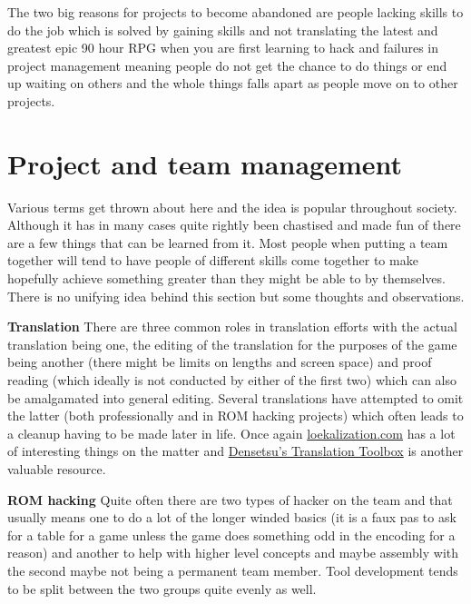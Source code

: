 \documentclass[
]{book}
\begin{document}
The two big reasons for projects to become abandoned are people lacking skills to do the job which is solved by gaining skills and not translating the latest and greatest epic 90 hour RPG when you are first learning to hack and failures in project management meaning people do not get the chance to do things or end up waiting on others and the whole things falls apart as people move on to other projects.

\hypertarget{project-and-team-management}{%
\section{Project and team management}\label{project-and-team-management}}

Various terms get thrown about here and the idea is popular throughout society. Although it has in many cases quite rightly been chastised and made fun of there are a few things that can be learned from it. Most people when putting a team together will tend to have people of different skills come together to make hopefully achieve something greater than they might be able to by themselves. There is no unifying idea behind this section but some thoughts and observations.

\textbf{Translation} There are three common roles in translation efforts with the actual translation being one, the editing of the translation for the purposes of the game being another (there might be limits on lengths and screen space) and proof reading (which ideally is not conducted by either of the first two) which can also be amalgamated into general editing. Several translations have attempted to omit the latter (both professionally and in ROM hacking projects) which often leads to a cleanup having to be made later in life. Once again \href{http://www.loekalization.com/mistakes.html}{loekalization.com} has a lot of interesting things on the matter and \href{http://gbatemp.net/topic/311523-densetsus-translation-toolbox/}{Densetsu's Translation Toolbox} is another valuable resource.

\textbf{ROM hacking} Quite often there are two types of hacker on the team and that usually means one to do a lot of the longer winded basics (it is a faux pas to ask for a table for a game unless the game does something odd in the encoding for a reason) and another to help with higher level concepts and maybe assembly with the second maybe not being a permanent team member. Tool development tends to be split between the two groups quite evenly as well.
\end{document}
